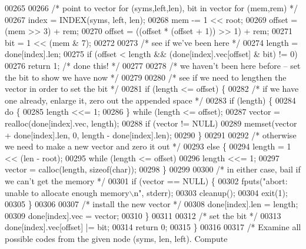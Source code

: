 \begin{DoxyCode}
00265 
00266     \textcolor{comment}{/* point to vector for (syms,left,len), bit in vector for (mem,rem) */}
00267     index = INDEX(syms, left, len);
00268     mem -= 1 << root;
00269     offset = (mem >> 3) + rem;
00270     offset = ((offset * (offset + 1)) >> 1) + rem;
00271     bit = 1 << (mem & 7);
00272 
00273     \textcolor{comment}{/* see if we've been here */}
00274     length = done[index].len;
00275     \textcolor{keywordflow}{if} (offset < length && (done[index].vec[offset] & bit) != 0)
00276         \textcolor{keywordflow}{return} 1;       \textcolor{comment}{/* done this! */}
00277 
00278     \textcolor{comment}{/* we haven't been here before -- set the bit to show we have now */}
00279 
00280     \textcolor{comment}{/* see if we need to lengthen the vector in order to set the bit */}
00281     \textcolor{keywordflow}{if} (length <= offset) \{
00282         \textcolor{comment}{/* if we have one already, enlarge it, zero out the appended space */}
00283         \textcolor{keywordflow}{if} (length) \{
00284             \textcolor{keywordflow}{do} \{
00285                 length <<= 1;
00286             \} \textcolor{keywordflow}{while} (length <= offset);
00287             vector = realloc(done[index].vec, length);
00288             \textcolor{keywordflow}{if} (vector != NULL)
00289                 memset(vector + done[index].len, 0, length - done[index].len);
00290         \}
00291 
00292         \textcolor{comment}{/* otherwise we need to make a new vector and zero it out */}
00293         \textcolor{keywordflow}{else} \{
00294             length = 1 << (len - root);
00295             \textcolor{keywordflow}{while} (length <= offset)
00296                 length <<= 1;
00297             vector = calloc(length, \textcolor{keyword}{sizeof}(\textcolor{keywordtype}{char}));
00298         \}
00299 
00300         \textcolor{comment}{/* in either case, bail if we can't get the memory */}
00301         \textcolor{keywordflow}{if} (vector == NULL) \{
00302             fputs(\textcolor{stringliteral}{"abort: unable to allocate enough memory\(\backslash\)n"}, stderr);
00303             cleanup();
00304             exit(1);
00305         \}
00306 
00307         \textcolor{comment}{/* install the new vector */}
00308         done[index].len = length;
00309         done[index].vec = vector;
00310     \}
00311 
00312     \textcolor{comment}{/* set the bit */}
00313     done[index].vec[offset] |= bit;
00314     \textcolor{keywordflow}{return} 0;
00315 \}
00316 
00317 \textcolor{comment}{/* Examine all possible codes from the given node (syms, len, left).  Compute}

\end{DoxyCode}
